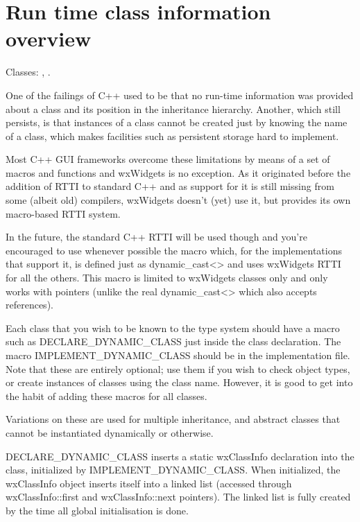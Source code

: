 \section{Run time class information overview}\label{runtimeclassoverview}

Classes: , .

One of the failings of C++ used to be that no run-time information was provided
about a class and its position in the inheritance hierarchy.
Another, which still persists, is that instances of a class cannot be created
just by knowing the name of a class, which makes facilities such as persistent
storage hard to implement.

Most C++ GUI frameworks overcome these limitations by means of a set of
macros and functions and wxWidgets is no exception. As it originated before the
addition of RTTI to standard C++ and as support for it is still missing from
some (albeit old) compilers, wxWidgets doesn't (yet) use it, but provides its
own macro-based RTTI system.

In the future, the standard C++ RTTI will be used though and you're encouraged
to use whenever possible the  macro which,
for the implementations that support it, is defined just as dynamic\_cast<> and
uses wxWidgets RTTI for all the others. This macro is limited to wxWidgets
classes only and only works with pointers (unlike the real dynamic\_cast<> which
also accepts references).

Each class that you wish to be known to the type system should have
a macro such as DECLARE\_DYNAMIC\_CLASS just inside the class declaration.
The macro IMPLEMENT\_DYNAMIC\_CLASS should be in the implementation file.
Note that these are entirely optional; use them if you wish to check object
types, or create instances of classes using the class name. However,
it is good to get into the habit of adding these macros for all classes.

Variations on these  are used for multiple inheritance, and abstract
classes that cannot be instantiated dynamically or otherwise.

DECLARE\_DYNAMIC\_CLASS inserts a static wxClassInfo declaration into the
class, initialized by IMPLEMENT\_DYNAMIC\_CLASS. When initialized, the
wxClassInfo object inserts itself into a linked list (accessed through
wxClassInfo::first and wxClassInfo::next pointers). The linked list
is fully created by the time all global initialisation is done.

